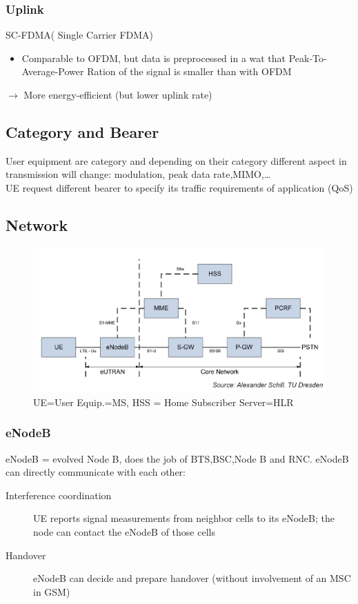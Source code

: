\subsubsection{Uplink}
SC-FDMA( Single Carrier FDMA)
\begin{itemize}
	\item Comparable to OFDM, but data is preprocessed in a wat that 
	Peak-To-Average-Power Ration of the signal is smaller than with 
	OFDM

\end{itemize}
$\to$ More energy-efficient (but lower uplink rate)

\subsection{Category and Bearer}
User equipment are category and depending on their category 
different aspect in transmission will change: modulation, peak data rate,MIMO,\ldots\\
UE request different bearer to specify its traffic requirements of application (QoS)

\subsection{Network}
\begin{figure}[ht!]
	\centering
	\includegraphics[scale=0.5]{img/lte.png}
	\caption{UE=User Equip.=MS, HSS = Home Subscriber Server=HLR}
\end{figure}

\subsubsection{eNodeB}
eNodeB = evolved Node B, does the job of BTS,BSC,Node B and RNC. eNodeB can 
directly communicate with each other:
\begin{description}
	\item[Interference coordination] UE reports signal measurements from neighbor 
	cells to its eNodeB; the node can contact the eNodeB of those cells
	\item[Handover] eNodeB can decide and prepare handover 
	(without involvement of an MSC in GSM)
\end{description}


